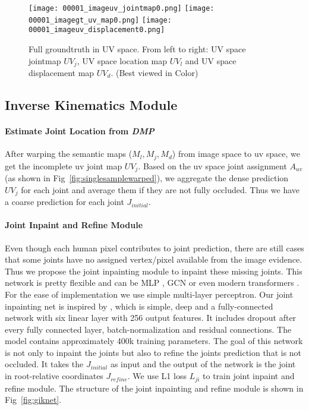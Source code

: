\documentclass[10pt,twocolumn,letterpaper]{article}
\begin{document}
\begin{figure}
\centering
\texttt{[image: 00001\_imageuv\_jointmap0.png]}
\texttt{[image: 00001\_imagegt\_uv\_map0.png]}
\texttt{[image: 00001\_imageuv\_displacement0.png]}
\caption{{Full groundtruth in UV space. From left to right:  UV space jointmap $UV_{j}$, UV space location map $UV_{l}$ and UV space displacement map $UV_{d}$. (Best viewed in Color) }}
\label{fig:singlesamplewarpedfull}
\end{figure}









 















\subsection{Inverse Kinematics Module}
\paragraph{Estimate Joint Location from \textit{DMP}} After warping the semantic maps ($M_l,M_j,M_d$) from image space to uv space, we get the incomplete uv joint map $UV_j$. Based on the uv space joint assignment $A_{uv}$ (as shown in Fig~\ref{fig:singlesamplewarped}), we aggregate the dense prediction $UV_j$ for each joint and average them if they are not fully occluded. Thus we have a coarse prediction for each joint $J_{initial}$.


\paragraph{Joint Inpaint and Refine Module} Even though each human pixel contributes to joint prediction, there are still cases that some joints have no assigned vertex/pixel available from the image evidence. Thus we propose 
the joint inpainting module to inpaint these missing joints. This network is pretty flexible and can be MLP \cite{simple}, GCN \cite{semanticsgcn} or even modern transformers \cite{METRO}. For the ease of implementation we use simple multi-layer perceptron. Our joint inpainting net is inspired by \cite{simple}, which is simple, deep and a fully-connected network with six linear layer with 256 output features. It includes dropout after every fully connected layer, batch-normalization and residual connections. The model contains approximately 400k training parameters. The goal of this network is not only to inpaint the joints but also to refine the joints prediction that is not occluded. It takes  the $J_{initial}$ as input and the output of the network is the joint in root-relative coordinates $J_{refine}$. We use L1 loss $L_{ji}$ to train joint inpaint and refine module. The structure of the joint inpainting and refine module is shown in Fig~\ref{fig:giknet}. 
\end{document}
